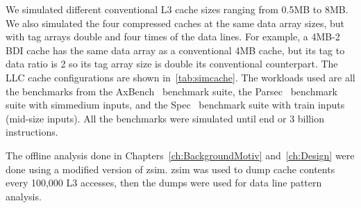 We simulated different conventional L3 cache sizes ranging from 0.5MB to 8MB. We also simulated the four compressed caches at the same data array sizes, but with tag arrays double and four times of the data lines. For example, a 4MB-2 BDI cache has the same data array as a conventional 4MB cache, but its tag to data ratio is 2 so its tag array size is double its conventional counterpart. The LLC cache configurations are shown in~\ref{tab:simcache}. The workloads used are all the benchmarks from the AxBench~\cite{axbench} benchmark suite, the Parsec~\cite{parsec} benchmark suite with simmedium inputs, and the Spec~\cite{spec} benchmark suite with train inputs (mid-size inputs). All the benchmarks were simulated until end or 3 billion instructions.\par
The offline analysis done in Chapters~\ref{ch:BackgroundMotiv} and~\ref{ch:Design} were done using a modified version of zsim. zsim was used to dump cache contents every 100,000 L3 accesses, then the dumps were used for data line pattern analysis.

